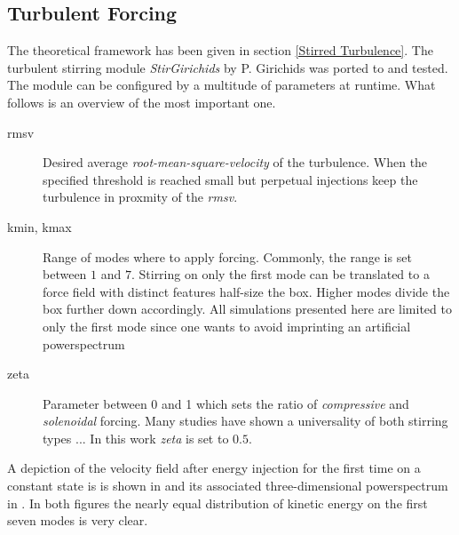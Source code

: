 \subsection{Turbulent Forcing}

The theoretical framework has been given in section \ref{Stirred Turbulence}. The turbulent
stirring module \emph{StirGirichids} by P. Girichids was ported to \FLEXI and tested. The
module can be configured by a multitude of parameters at runtime. What follows is an overview
of the most important one.
\begin{description}
    \item [rmsv] Desired average \emph{root-mean-square-velocity} of the turbulence. When the
            specified threshold is reached small but perpetual injections keep the turbulence
            in proxmity of the \emph{rmsv}.
    \item [kmin, kmax] Range of modes where to apply forcing. Commonly, the range
            is set between $1$ and $7$. Stirring on only the first mode can be translated to a
            force field with distinct features half-size the box. Higher modes divide the box further
            down accordingly. All simulations presented here are limited to only the
            first mode since one wants to avoid imprinting an artificial powerspectrum
    \item [zeta] Parameter between 0 and 1 which sets the ratio of \emph{compressive} and \emph{solenoidal}
            forcing. Many studies have shown a universality of both stirring types ...
            In this work \emph{zeta} is set to $0.5$.
\end{description}
A depiction of the velocity field after energy injection for the first time on
a constant state is is shown in  and its associated
three-dimensional powerspectrum in . In
both figures the nearly equal distribution of kinetic energy on the first seven modes
is very clear.

